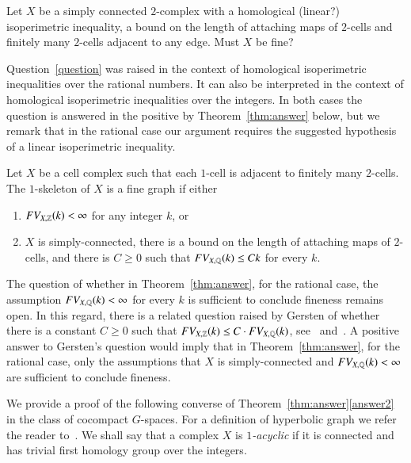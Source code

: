 \begin{question}\label{question} \cite[Question. 2.51]{GrMa09}
 Let $X$ be a simply connected $2$-complex with a homological (linear?) isoperimetric inequality, a bound on the length of attaching maps of $2$-cells  and finitely many $2$-cells adjacent to any edge. Must $X$ be fine?
\end{question}

Question~\ref{question}   was raised in the context of homological isoperimetric inequalities over the rational numbers. It can also be interpreted in the context of homological isoperimetric inequalities over the integers. In both cases the question is answered in the positive by Theorem~\ref{thm:answer} below, but we remark that in the rational case our argument requires the suggested hypothesis of a linear isoperimetric inequality.

\begin{theorem}\label{thm:answer} Let $X$ be a cell complex such that each $1$-cell  is adjacent to finitely many $2$-cells. The $1$-skeleton of $X$ is a fine graph if either
\begin{enumerate}
\item $FV_{X, \mathbb{Z}}(k)<\infty$ for any integer $k$, or 
\item \label{answer2}  $X$ is  simply-connected, there is a bound on the length of attaching maps of $2$-cells, and there is $C\geq 0$ such that  $FV_{X, \mathbb{Q}}(k)\leq Ck$ for every $k$. 
\end{enumerate}
\end{theorem}

The question of whether in Theorem~\ref{thm:answer}, for the rational case,  the assumption  $FV_{X, \mathbb{Q}}(k)<\infty$ for every $k$ is sufficient to conclude fineness remains open. 
In this regard, there is a related question raised by Gersten of whether  there is a constant $C\geq 0$ such that $ FV_{X, \mathbb{Z}}(k) \leq C\cdot FV_{X, \mathbb{Q}}(k)$, see~\cite[Section 4, open question]{GerstenCohomology} and~\cite[Introduction]{Ge99}. A positive answer to Gersten's question would imply that in Theorem~\ref{thm:answer}, for the rational case, only  the assumptions that $X$ is simply-connected and $FV_{X, \mathbb{Q}}(k)<\infty$ are sufficient to conclude fineness.
 
We provide a proof of the following  converse of Theorem~\ref{thm:answer}\eqref{answer2} in the class of cocompact $G$-spaces. For a definition of hyperbolic graph we refer the reader to~\cite{Bo12, BrHa99}. We shall say that a complex $X$ is \emph{$1$-acyclic} if it is connected and has trivial first homology group over the integers.  

